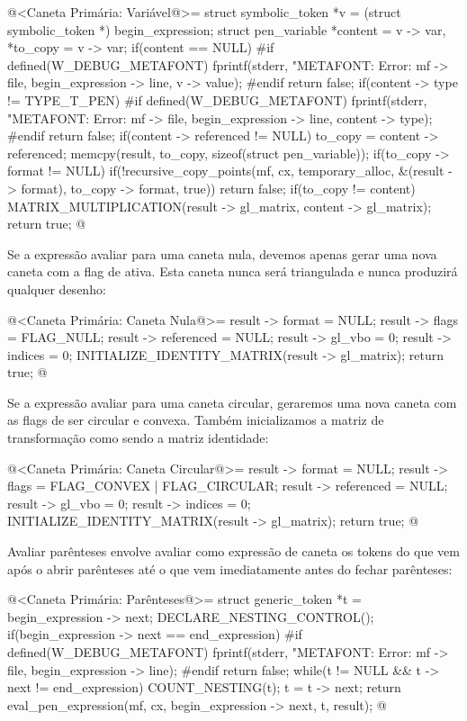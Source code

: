 {{{{{{\iniciocodigo
@<Caneta Primária: Variável@>=
struct symbolic_token *v = (struct symbolic_token *) begin_expression;
struct pen_variable *content = v -> var, *to_copy = v -> var;
if(content == NULL){
#if defined(W_DEBUG_METAFONT)
  fprintf(stderr, "METAFONT: Error: %
          mf -> file, begin_expression -> line, v -> value);
#endif
  return false;
}
if(content -> type != TYPE_T_PEN){
#if defined(W_DEBUG_METAFONT)
  fprintf(stderr, "METAFONT: Error: %
          mf -> file, begin_expression -> line, content -> type);
#endif
  return false;
}
if(content -> referenced != NULL)
  to_copy = content -> referenced;
memcpy(result, to_copy, sizeof(struct pen_variable));
if(to_copy -> format != NULL)
  if(!recursive_copy_points(mf, cx, temporary_alloc, &(result -> format),
                        to_copy -> format, true))
    return false;
if(to_copy != content)
  MATRIX_MULTIPLICATION(result -> gl_matrix, content -> gl_matrix);
return true;
@
\fimcodigo

Se a expressão avaliar para uma caneta nula, devemos apenas gerar uma
nova caneta com a flag de  ativa. Esta caneta
nunca será triangulada e nunca produzirá qualquer desenho:

\iniciocodigo
@<Caneta Primária: Caneta Nula@>=
result -> format = NULL;
result -> flags = FLAG_NULL;
result -> referenced = NULL;
result -> gl_vbo = 0;
result -> indices = 0;
INITIALIZE_IDENTITY_MATRIX(result -> gl_matrix);
return true;
@
\fimcodigo

Se a expressão avaliar para uma caneta circular, geraremos uma nova
caneta com as flags de ser circular e convexa. Também inicializamos a
matriz de transformação como sendo a matriz identidade:

\iniciocodigo
@<Caneta Primária: Caneta Circular@>=
result -> format = NULL;
result -> flags = FLAG_CONVEX | FLAG_CIRCULAR;
result -> referenced = NULL;
result -> gl_vbo = 0;
result -> indices = 0;
INITIALIZE_IDENTITY_MATRIX(result -> gl_matrix);
return true;
@
\fimcodigo

Avaliar parênteses envolve avaliar como expressão de caneta os tokens
do que vem após o abrir parênteses até o que vem imediatamente antes
do fechar parênteses:

\iniciocodigo
@<Caneta Primária: Parênteses@>=
struct generic_token *t = begin_expression -> next;
DECLARE_NESTING_CONTROL();
if(begin_expression -> next == end_expression){
#if defined(W_DEBUG_METAFONT)
  fprintf(stderr, "METAFONT: Error: %
          mf -> file, begin_expression -> line);
#endif
  return false;
}
while(t != NULL && t -> next != end_expression){
  COUNT_NESTING(t);
  t = t -> next;
}
return eval_pen_expression(mf, cx, begin_expression -> next, t, result);
@
\fimcodigo

}}}}}}
